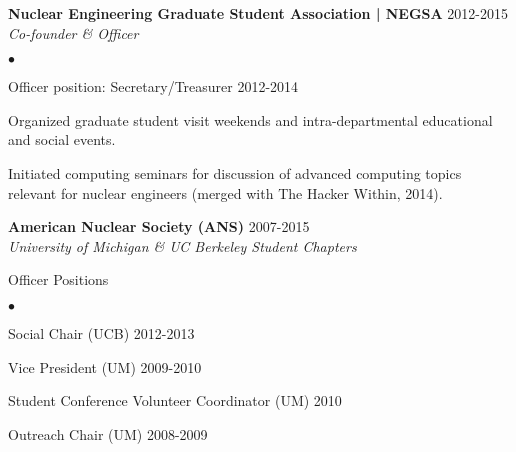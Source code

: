 \documentclass[margin,line]{res}
\newenvironment{list1}{
  \begin{list}{\ding{113}}{%
      \setlength{\itemsep}{0in}
      \setlength{\parsep}{0in} \setlength{\parskip}{0in}
      \setlength{\topsep}{0in} \setlength{\partopsep}{0in} 
      \setlength{\leftmargin}{0.17in}}}{\end{list}}
\newenvironment{list2}{
  \begin{list}{$\bullet$}{%
      \setlength{\itemsep}{0in}
      \setlength{\parsep}{0in} \setlength{\parskip}{0in}
      \setlength{\topsep}{0in} \setlength{\partopsep}{0in} 
      \setlength{\leftmargin}{0.2in}}}{\end{list}}
\begin{document}
\begin{resume}
{\bf Nuclear Engineering Graduate Student Association | NEGSA} \hfill 2012-2015\\
{\em Co-founder \& Officer} 

\begin{list2}
  \item Officer position: Secretary/Treasurer \hfill 2012-2014
  \item Organized graduate student visit weekends and intra-departmental 
        educational and social events.
  \item Initiated computing seminars for discussion of advanced computing 
        topics relevant for nuclear engineers (merged with The Hacker Within,
        2014).
\end{list2}

{\bf American Nuclear Society (ANS)} \hfill 2007-2015 \\
{\em University of Michigan \& UC Berkeley Student Chapters} 

\begin{list1}
  \item[] Officer Positions
  \begin{list2}
    \item Social Chair (UCB) \hfill 2012-2013
    \item Vice President (UM) \hfill 2009-2010
    \item Student Conference Volunteer Coordinator (UM) \hfill 2010
    \item Outreach Chair (UM) \hfill 2008-2009
  \end{list2}
\end{list1}


%

\end{resume}
\end{document}
